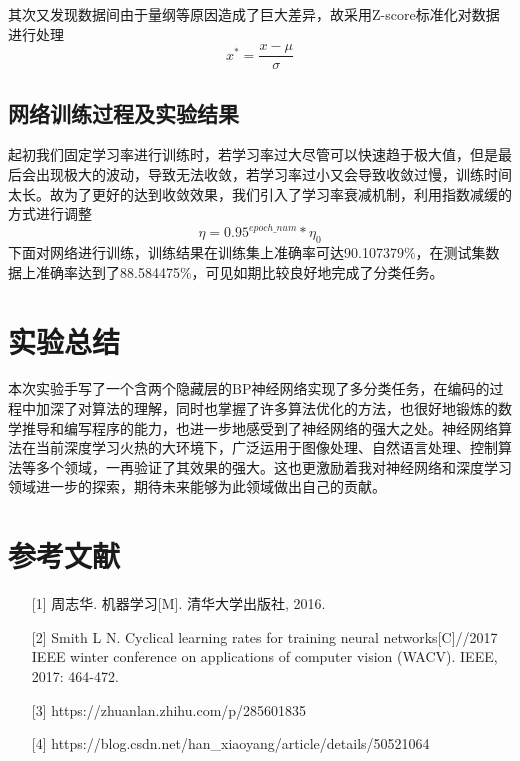 \documentclass{progartcn}
\begin{document}
其次又发现数据间由于量纲等原因造成了巨大差异，故采用Z-score标准化对数据进行处理
\begin{equation}
	x^*=\frac{x-\mu}{\sigma}
\end{equation}

\subsection{网络训练过程及实验结果}
起初我们固定学习率进行训练时，若学习率过大尽管可以快速趋于极大值，但是最后会出现极大的波动，导致无法收敛，若学习率过小又会导致收敛过慢，训练时间太长。故为了更好的达到收敛效果，我们引入了学习率衰减机制，利用指数减缓的方式进行调整
\begin{equation}
	\eta =0.95^{epoch\_num}*\eta_0
\end{equation}
下面对网络进行训练，训练结果在训练集上准确率可达90.107379\%，在测试集数据上准确率达到了88.584475\%，可见如期比较良好地完成了分类任务。


\section{实验总结}

本次实验手写了一个含两个隐藏层的BP神经网络实现了多分类任务，在编码的过程中加深了对算法的理解，同时也掌握了许多算法优化的方法，也很好地锻炼的数学推导和编写程序的能力，也进一步地感受到了神经网络的强大之处。神经网络算法在当前深度学习火热的大环境下，广泛运用于图像处理、自然语言处理、控制算法等多个领域，一再验证了其效果的强大。这也更激励着我对神经网络和深度学习领域进一步的探索，期待未来能够为此领域做出自己的贡献。

\section{参考文献}
\begin{enumerate}[itemsep=0.01pt]
	\item[] [1] 周志华. 机器学习[M]. 清华大学出版社, 2016.
	\item[] [2] Smith L N. Cyclical learning rates for training neural networks[C]//2017 IEEE winter conference on applications of computer vision (WACV). IEEE, 2017: 464-472.
	\item[] [3] https://zhuanlan.zhihu.com/p/285601835
	\item[] [4] https://blog.csdn.net/han\_xiaoyang/article/details/50521064
\end{enumerate}
\end{document}
